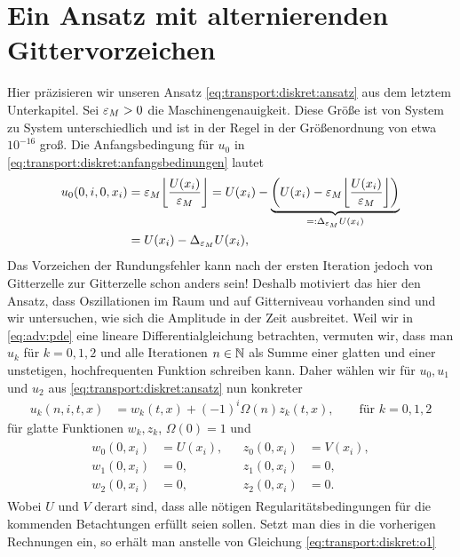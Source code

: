 \section {Ein Ansatz mit alternierenden Gittervorzeichen}\label{sec:transport:osz}

Hier präzisieren wir unseren Ansatz \eqref{eq:transport:diskret:ansatz} aus dem letztem Unterkapitel. %
Sei $\varepsilon_M > 0$ die Maschinengenauigkeit.
Diese Größe ist von System zu System unterschiedlich und ist in der Regel in der Größenordnung von etwa $10^{-16}$ groß.
Die Anfangsbedingung für $u_0$ in \eqref{eq:transport:diskret:anfangsbedinungen} lautet
\begin{align*}
u_0(0, i, 0, x_i) &= \rd{U(x_i)} = U(x_i) - \underbrace{\left( U(x_i) - \rd{U(x_i)} \right)}_{=: \Delta_{\eps_M} U(x_i)}\\
&= U(x_i) - \Delta_{\eps_M} U(x_i),
\end{align*}
Das Vorzeichen der Rundungsfehler kann nach der ersten Iteration jedoch von Gitterzelle zur Gitterzelle schon anders sein!
Deshalb motiviert das hier den Ansatz, dass Oszillationen im Raum und auf Gitterniveau vorhanden sind und wir untersuchen, wie sich die Amplitude in der Zeit ausbreitet.
Weil wir in \eqref{eq:adv:pde} eine lineare Differentialgleichung betrachten, vermuten wir, dass man $u_k$ für $k = 0,1,2$ und alle Iterationen $n \in \mathbb N$ als Summe einer glatten und einer unstetigen, hochfrequenten Funktion schreiben kann.
Daher wählen wir für $u_0, u_1$ und $u_2$ aus \eqref{eq:transport:diskret:ansatz} nun konkreter 
\begin{align*}
u_k(n, i, t, x) &= w_k(t, x) + (-1)^i \Omega(n) z_k(t, x), \qquad \text{für $k = 0,1,2$}
\end{align*}
für glatte Funktionen $w_k, z_k$, $\Omega(0) = 1$ und
\begin{align}\label{eq:transport:osz:anfangsbedinungen}
\begin{split}
w_0(0, x_i) &= U(x_i),\\
w_1(0, x_i) &= 0,\\
w_2(0, x_i) &= 0,
\end{split}&
\begin{split}
z_0(0, x_i) &= V(x_i),\\
z_1(0, x_i) &= 0,\\
z_2(0, x_i) &= 0.
\end{split}
\end{align}
Wobei $U$ und $V$ derart sind, dass alle nötigen Regularitätsbedingungen für die kommenden Betachtungen erfüllt seien sollen.
Setzt man dies in die vorherigen Rechnungen ein, so erhält man anstelle von Gleichung \eqref{eq:transport:diskret:o1}

